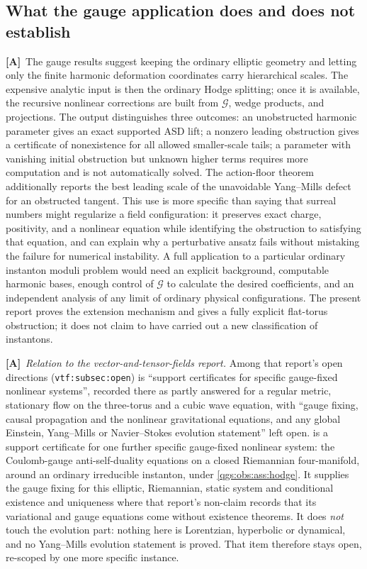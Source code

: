 \documentclass[11pt,oneside]{article}
\numberwithin{equation}{section}
\theoremstyle{plain}
\theoremstyle{definition}
\theoremstyle{remark}
\newcommand{\Green}{\mathcal G}
\newcommand{\TA}{\textcolor{TierA}{\textsf{\bfseries[A]}}}
\begin{document}
\subsection{What the gauge application does and does not establish}\label{qgs:sec:vtfrel}
\TA\ The gauge results suggest keeping the ordinary elliptic geometry and letting only the finite harmonic deformation coordinates carry hierarchical scales. The expensive analytic input is then the ordinary Hodge splitting; once it is available, the recursive nonlinear corrections are built from $\Green$, wedge products, and projections. The output distinguishes three outcomes: an unobstructed harmonic parameter gives an exact supported ASD lift; a nonzero leading obstruction gives a certificate of nonexistence for all allowed smaller-scale tails; a parameter with vanishing initial obstruction but unknown higher terms requires more computation and is not automatically solved. The action-floor theorem additionally reports the best leading scale of the unavoidable Yang--Mills defect for an obstructed tangent. This use is more specific than saying that surreal numbers might regularize a field configuration: it preserves exact charge, positivity, and a nonlinear equation while identifying the obstruction to satisfying that equation, and can explain why a perturbative ansatz fails without mistaking the failure for numerical instability. A full application to a particular ordinary instanton moduli problem would need an explicit background, computable harmonic bases, enough control of $\Green$ to calculate the desired coefficients, and an independent analysis of any limit of ordinary physical configurations. The present report proves the extension mechanism and gives a fully explicit flat-torus obstruction; it does not claim to have carried out a new classification of instantons.

\TA\ \emph{Relation to the vector-and-tensor-fields report.} Among that report's open directions (\texttt{vtf:subsec:open}) is ``support certificates for specific gauge-fixed nonlinear systems'', recorded there as partly answered for a regular metric, stationary flow on the three-torus and a cubic wave equation, with ``gauge fixing, causal propagation and the nonlinear gravitational equations, and any global Einstein, Yang--Mills or Navier--Stokes evolution statement'' left open.  is a support certificate for one further specific gauge-fixed nonlinear system: the Coulomb-gauge anti-self-duality equations on a closed Riemannian four-manifold, around an ordinary irreducible instanton, under \cref{qgs:obs:ass:hodge}. It supplies the gauge fixing for this elliptic, Riemannian, static system and conditional existence and uniqueness where that report's non-claim records that its variational and gauge equations come without existence theorems. It does \emph{not} touch the evolution part: nothing here is Lorentzian, hyperbolic or dynamical, and no Yang--Mills evolution statement is proved. That item therefore stays open, re-scoped by one more specific instance.
\end{document}
